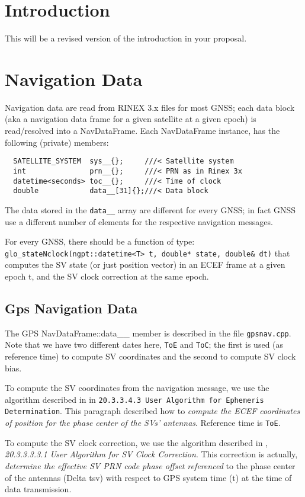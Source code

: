 \documentclass[a4paper, 10pt]{article}
\begin{document}
\begin{multicols}{2}
\section{Introduction}
This will be a revised version of the introduction in your proposal.

\section{Navigation Data}
Navigation data are read from RINEX 3.x files for most GNSS; each data block (aka
a navigation data frame for a given satellite at a given epoch) is read/resolved 
into a NavDataFrame. Each NavDataFrame instance, has the following (private)
members:
\begin{lstlisting}
  SATELLITE_SYSTEM  sys__{};     ///< Satellite system
  int               prn__{};     ///< PRN as in Rinex 3x
  datetime<seconds> toc__{};     ///< Time of clock
  double            data__[31]{};///< Data block
\end{lstlisting}
The data stored in the \texttt{data\_\_} array are different for every GNSS; in fact
GNSS use a different number of elements for the respective navigation messages.

For every GNSS, there should be a function of type: \texttt{glo\_stateNclock(ngpt::datetime<T> t, double* state, double\& dt)}
that computes the SV state (or just position vector) in an ECEF frame at a given
epoch t, and the SV clock correction at the same epoch.
\subsection{Gps Navigation Data}
The GPS NavDataFrame::data\_\_ member is described in the file \texttt{gpsnav.cpp}.
Note that we have two different dates here, \texttt{ToE} and \texttt{ToC}; the first
is used (as reference time) to compute SV coordinates and the second to compute
SV clock bias.

To compute the SV coordinates from the navigation message, we use the algorithm 
described in \cite{is_gps_200} in \texttt{20.3.3.4.3 User Algorithm for Ephemeris Determination}. This paragraph described how to \emph{compute the ECEF coordinates of position for the phase center of the SVs’ antennas}. Reference time is \texttt{ToE}.

To compute the SV clock correction, we use the algorithm described in \cite{is_gps_200},
\emph{20.3.3.3.3.1 User Algorithm for SV Clock Correction}. This correction is actually, 
 \emph{determine the effective SV PRN code phase offset referenced} to the phase center of the antennas (Delta tsv) with respect to GPS system time (t) at the time of data transmission. 

\end{multicols}
\end{document}

